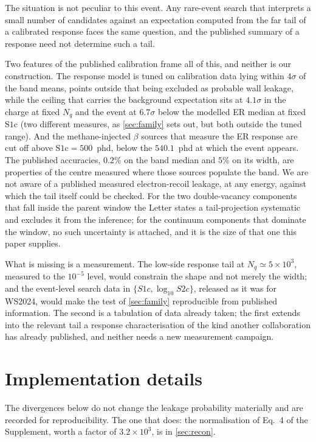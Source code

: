 \documentclass[11pt,a4paper]{article}
\begin{document}
The situation is not peculiar to this event. Any rare-event search that
interprets a small number of candidates against an expectation computed from
the far tail of a calibrated response faces the same question, and the
published summary of a response need not determine such a tail.

Two features of the published calibration frame all of this, and
neither is our construction. The response model is tuned on calibration
data lying within \(4\sigma\) of the band means, points outside that
being excluded as probable wall leakage, while the ceiling that carries
the background expectation sits at \(4.1\sigma\) in the charge at fixed
\(N_q\) and the event at \(6.7\sigma\) below the modelled ER median at
fixed \(\mathrm{S1c}\) (two different measures, as \cref{sec:family}
sets out, but both outside the tuned range). And the methane-injected
\(\beta\) sources that measure the ER response are cut off above
\(\mathrm{S1c}=500\)~phd, below the \(540.1\)~phd at which the event
appears. The published accuracies, \(0.2\%\) on the band median and
\(5\%\) on its width, are properties of the centre measured where those
sources populate the band. We are not aware of a published measured
electron-recoil leakage, at any energy, against which the tail itself
could be checked. For the two double-vacancy components that fall inside
the parent window the Letter states a tail-projection systematic and
excludes it from the inference; for the continuum components that
dominate the window, no such uncertainty is attached, and it is the size
of that one this paper supplies.

What is missing is a measurement. The low-side response tail at
\(N_q\simeq5\times10^{3}\), measured to the \(10^{-5}\) level, would
constrain the shape and not merely the width;  and the event-level
search data in \(\{S1c,\log_{10}S2c\}\), released as it was for WS2024,
would make the test of \cref{sec:family} reproducible from published
information. The second is a tabulation of data already taken; the first
extends into the relevant tail a response characterisation of the kind
another collaboration has already published, and neither needs a new
measurement campaign.


\appendix

\section{Implementation details}%
\label{app:impl}

The divergences below do not change the leakage probability materially
and are recorded for reproducibility. The one that does: the
normalisation of Eq.~4 of the Supplement, worth a factor of
\(3.2\times10^{3}\), is in \cref{sec:recon}.
\end{document}
